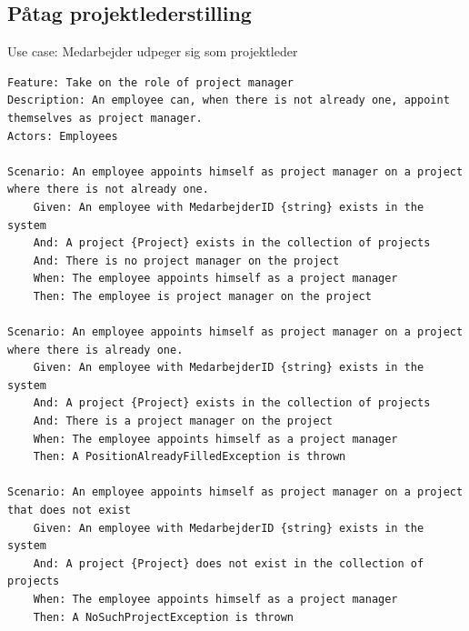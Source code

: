 \subsection{Påtag projektlederstilling} 
\begin{listing}[H]
    \centering
    \caption{Use case: Medarbejder udpeger sig som projektleder} \label{lst:usecase_bliv_projektleder}
    \begin{verbatim}  
Feature: Take on the role of project manager
Description: An employee can, when there is not already one, appoint themselves as project manager.
Actors: Employees

Scenario: An employee appoints himself as project manager on a project where there is not already one.
    Given: An employee with MedarbejderID {string} exists in the system
    And: A project {Project} exists in the collection of projects
    And: There is no project manager on the project
    When: The employee appoints himself as a project manager
    Then: The employee is project manager on the project

Scenario: An employee appoints himself as project manager on a project where there is already one.
    Given: An employee with MedarbejderID {string} exists in the system
    And: A project {Project} exists in the collection of projects
    And: There is a project manager on the project
    When: The employee appoints himself as a project manager
    Then: A PositionAlreadyFilledException is thrown

Scenario: An employee appoints himself as project manager on a project that does not exist
    Given: An employee with MedarbejderID {string} exists in the system
    And: A project {Project} does not exist in the collection of projects
    When: The employee appoints himself as a project manager
    Then: A NoSuchProjectException is thrown
    \end{verbatim}
\end{listing}


